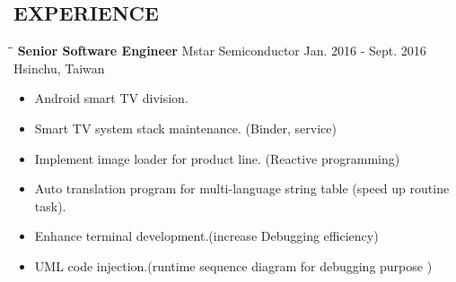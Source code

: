 \documentclass{res}
\begin{document}
\begin{resume}
			\section{EXPERIENCE}
	 			\vspace{-0.05in}	
				\begin{tabbing}
	 				\hspace{2.3in}\= \hspace{2.6in}\= \kill %
					{\bf Senior Software Engineer} \>Mstar Semiconductor     \>Jan. 2016 - Sept. 2016\\
														 \>Hsinchu, Taiwan
	 			\end{tabbing}
	 			\vspace{-20pt}      %
	 			\vspace{0.2in}	
				\begin{itemize}
					\item Android smart TV division.
					\vspace{-0.05in}
					\item Smart TV system stack maintenance. (Binder, service)	
					\vspace{-0.05in}
					\item Implement image loader for product line. (Reactive programming)
					\vspace{-0.05in}	
					\item Auto translation program for multi-language string table (speed up routine task).
					\vspace{-0.05in}	
					\item Enhance terminal development.(increase Debugging efficiency)
					\vspace{-0.05in}	
					\item UML code injection.(runtime sequence diagram for debugging purpose )



\end{itemize}
\end{resume}
\end{document}
